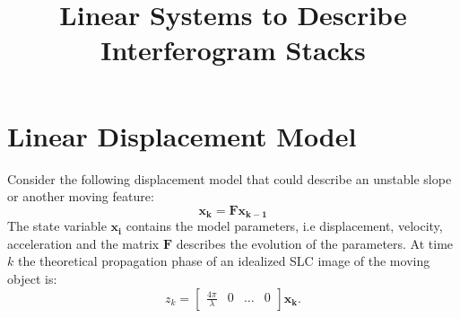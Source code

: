 \documentclass{article}
\title{Linear Systems to Describe Interferogram Stacks}
\begin{document}
\maketitle
\section{Linear Displacement Model}
Consider the following displacement model that could describe an unstable slope or another moving feature:
\begin{equation}
	\mathbf{x_k} = \mathbf{F} \mathbf{x_{k-1}}
\end{equation}
The state variable $\mathbf{x_i}$ contains the model parameters, i.e displacement, velocity, acceleration and the matrix $\mathbf{F}$ describes the evolution of the parameters. At time $k$ the theoretical propagation phase of an idealized SLC image of the moving object is:
\begin{equation}
	z_k = \begin{bmatrix} \frac{4\pi}{\lambda} & 0 & \dots & 0\end{bmatrix} \mathbf{x_k}.
\end{equation}
\end{document}
